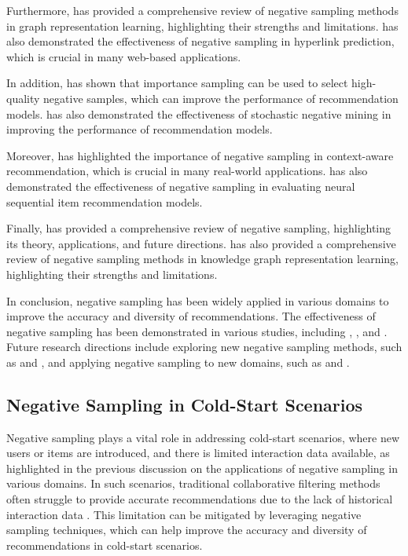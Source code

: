 \documentclass[11pt,a4paper]{article}
\begin{document}
Furthermore, \cite{doi:10.1145/3394486.3403218} has provided a comprehensive review of negative sampling methods in graph representation learning, highlighting their strengths and limitations. \cite{doi:10.1007/978-3-030-47436-2_46} has also demonstrated the effectiveness of negative sampling in hyperlink prediction, which is crucial in many web-based applications.

In addition, \cite{doi:10.1145/3366423.3380187} has shown that importance sampling can be used to select high-quality negative samples, which can improve the performance of recommendation models. \cite{arxiv:1810.07076} has also demonstrated the effectiveness of stochastic negative mining in improving the performance of recommendation models.

Moreover, \cite{doi:10.1145/3366423.3380303} has highlighted the importance of negative sampling in context-aware recommendation, which is crucial in many real-world applications. \cite{doi:10.1145/3460231.3475943} has also demonstrated the effectiveness of negative sampling in evaluating neural sequential item recommendation models.

Finally, \cite{doi:10.1109/tpami.2024.3371473} has provided a comprehensive review of negative sampling, highlighting its theory, applications, and future directions. \cite{arxiv:2402.19195} has also provided a comprehensive review of negative sampling methods in knowledge graph representation learning, highlighting their strengths and limitations.

In conclusion, negative sampling has been widely applied in various domains to improve the accuracy and diversity of recommendations. The effectiveness of negative sampling has been demonstrated in various studies, including \cite{doi:10.1145/3581783.3612101}, \cite{doi:10.1145/3604915.3608783}, and \cite{doi:10.1145/3543507.3583223}. Future research directions include exploring new negative sampling methods, such as \cite{arxiv:2403.11408} and \cite{doi:10.1007/s11063-024-11522-2}, and applying negative sampling to new domains, such as \cite{doi:10.1109/access.2025.3576124} and \cite{arxiv:2403.03993}.


\subsection{Negative Sampling in Cold-Start Scenarios}


Negative sampling plays a vital role in addressing cold-start scenarios, where new users or items are introduced, and there is limited interaction data available, as highlighted in the previous discussion on the applications of negative sampling in various domains. In such scenarios, traditional collaborative filtering methods often struggle to provide accurate recommendations due to the lack of historical interaction data \cite{doi:10.1155/2009/421425}. This limitation can be mitigated by leveraging negative sampling techniques, which can help improve the accuracy and diversity of recommendations in cold-start scenarios.
\end{document}
